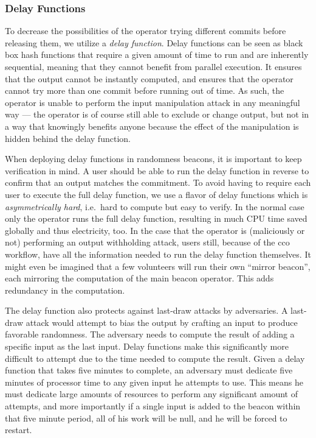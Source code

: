 \subsubsection{Delay Functions}
To decrease the possibilities of the operator trying different commits before releasing them, we utilize a \emph{delay function}.
Delay functions can be seen as black box hash functions that require a given amount of time to run and are inherently sequential, meaning that they cannot benefit from parallel execution.
It ensures that the output cannot be instantly computed, and ensures that the operator cannot try more than one commit before running out of time.
As such, the operator is unable to perform the input manipulation attack in any meaningful way --- the operator is of course still able to exclude or change output, but not in a way that knowingly benefits anyone because the effect of the manipulation is hidden behind the delay function.

When deploying delay functions in randomness beacons, it is important to keep verification in mind.
A user should be able to run the delay function in reverse to confirm that an output matches the commitment.
To avoid having to require each user to execute the full delay function, we use a flavor of delay functions which is \emph{asymmetrically hard}, i.e.\ hard to compute but easy to verify.
In the normal case only the operator runs the full delay function, resulting in much CPU time saved globally and thus electricity, too.
In the case that the operator is (maliciously or not) performing an output withholding attack, users still, because of the \gls{cco} workflow, have all the information needed to run the delay function themselves.
It might even be imagined that a few volunteers will run their own \enquote{mirror beacon}, each mirroring the computation of the main beacon operator.
This adds redundancy in the computation.

The delay function also protects against last-draw attacks by adversaries.
A last-draw attack would attempt to bias the output by crafting an input to produce favorable randomness.
The adversary needs to compute the result of adding a specific input as the last input.
Delay functions make this significantly more difficult to attempt due to the time needed to compute the result.
Given a delay function that takes five minutes to complete, an adversary must dedicate five minutes of processor time to any given input he attempts to use.
This means he must dedicate large amounts of resources to perform any significant amount of attempts, and more importantly if a single input is added to the beacon within that five minute period, all of his work will be null, and he will be forced to restart.

